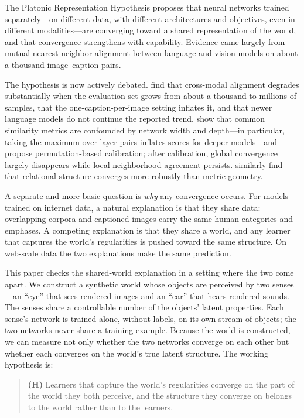 \documentclass[11pt]{article}
\begin{document}
The Platonic Representation Hypothesis \citep{huh2024platonic} proposes that neural networks trained separately---on different data, with different architectures and objectives, even in different modalities---are converging toward a shared representation of the world, and that convergence strengthens with capability. Evidence came largely from mutual nearest-neighbor alignment between language and vision models on about a thousand image--caption pairs.

The hypothesis is now actively debated. \citet{koepke2026cave} find that cross-modal alignment degrades substantially when the evaluation set grows from about a thousand to millions of samples, that the one-caption-per-image setting inflates it, and that newer language models do not continue the reported trend. \citet{groger2026aristotelian} show that common similarity metrics are confounded by network width and depth---in particular, taking the maximum over layer pairs inflates scores for deeper models---and propose permutation-based calibration; after calibration, global convergence largely disappears while local neighborhood agreement persists. \citet{you2026structure} similarly find that relational structure converges more robustly than metric geometry.

A separate and more basic question is \emph{why} any convergence occurs. For models trained on internet data, a natural explanation is that they share data: overlapping corpora and captioned images carry the same human categories and emphases. A competing explanation is that they share a world, and any learner that captures the world's regularities is pushed toward the same structure. On web-scale data the two explanations make the same prediction.

This paper checks the shared-world explanation in a setting where the two come apart. We construct a synthetic world whose objects are perceived by two senses---an ``eye'' that sees rendered images and an ``ear'' that hears rendered sounds. The senses share a controllable number of the objects' latent properties. Each sense's network is trained alone, without labels, on its own stream of objects; the two networks never share a training example. Because the world is constructed, we can measure not only whether the two networks converge on each other but whether each converges on the world's true latent structure. The working hypothesis is:

\begin{quote}
\textbf{(H)} Learners that capture the world's regularities converge on the part of the world they both perceive, and the structure they converge on belongs to the world rather than to the learners.
\end{quote}
\end{document}
